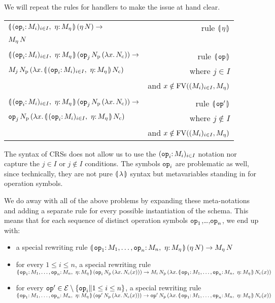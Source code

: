 We will repeat the rules for handlers to make the issue at hand clear.

\begin{tabular}{lr}
  $\ap{\cibanana}{(\ap{\eta}{N})} \to$ & rule $\llparenthesis \, \eta \, \rrparenthesis$ \\
  $M_\eta\,N$ & \\
  \\
  $\ap{\cibanana}{(\ap{\ap{\op{op}_j}{N_{\mathrm{p}}}}{(\lam{x}{N_{\mathrm{c}}})})} \to$ & rule $\llparenthesis \, \mathtt{op} \, \rrparenthesis$ \\
  $\ap{M_j}{\ap{N_{\mathrm{p}}}{(\lam{x}{\ap{\cibanana}{N_{\mathrm{c}}}})}}$
  & where $j \in I$ \\
  & and $x \notin \operatorname{FV}((M_i)_{i \in I}, M_\eta)$ \\
  \\
  $\ap{\cibanana}{(\ap{\ap{\op{op}_j}{N_{\mathrm{p}}}}{(\lam{x}{N_{\mathrm{c}}})})} \to$ & rule $\llparenthesis \, \mathtt{op}' \, \rrparenthesis$ \\
  $\ap{\op{op}_j}{\ap{N_{\mathrm{p}}}{(\lam{x}{\ap{\cibanana}{N_{\mathrm{c}}}})}}$
  & where $j \notin I$ \\
  & and $x \notin \operatorname{FV}((M_i)_{i \in I}, M_\eta)$
\end{tabular}

The syntax of CRSs does not allow us to use the $(\onto{\op{op}_i}{M_i})_{i
  \in I}$ notation nor capture the $j \in I$ or $j \notin I$ conditions.
The symbols $\mathtt{op}_i$ are problematic as well, since technically, they
are not pure $\llparenthesis \, \lambda \, \rrparenthesis$ syntax but metavariables standing in for
operation symbols.

We do away with all of the above problems by expanding these meta-notations
and adding a separate rule for every possible instantiation of the
schema. This means that for each sequence of distinct operation symbols
$\mathtt{op}_1$,\ldots,$\mathtt{op}_n$, we end up with:
\begin{itemize}
\item a special rewriting rule
  $\ap{\banana{\onto{\op{op}_1}{M_1},\ldots,\onto{\op{op}_n}{M_n},\ 
    \onto{\eta}{M_\eta}}}{(\etaE{N})}
  \to \ap{M_\eta}{N}$
\item for every $1 \le i \le n$, a special rewriting rule \\
  $\ap{\banana{\onto{\op{op}_1}{M_1},\ldots,\onto{\op{op}_n}{M_n},\ 
    \onto{\eta}{M_\eta}}}{(\app{\op{op}_i}{N_{\mathrm{p}}}{(\lam{x}{N_{\mathrm{c}}(x)})})}
  \\ \to
  \app{M_i}{N_{\mathrm{p}}}{(\lam{x}{\ap{\banana{\onto{\op{op}_1}{M_1},\ldots,\onto{\op{op}_n}{M_n},\ \onto{\eta}{M_\eta}}}{N_{\mathrm{c}}(x)}})}$
\item for every $\mathtt{op}' \in \mathcal{E} \setminus \{\mathtt{op}_i \| 1 \le i \le n\}$, a special
  rewriting rule \\
  $\ap{\banana{\onto{\op{op}_1}{M_1},\ldots,\onto{\op{op}_n}{M_n},\ 
    \onto{\eta}{M_\eta}}}{(\app{\op{op}'}{N_{\mathrm{p}}}{(\lam{x}{N_{\mathrm{c}}(x)})})}
  \\ \to
  \app{\op{op}'}{N_{\mathrm{p}}}{(\lam{x}{\ap{\banana{\onto{\op{op}_1}{M_1},\ldots,\onto{\op{op}_n}{M_n},\ \onto{\eta}{M_\eta}}}{N_{\mathrm{c}}(x)}})}$
\end{itemize}

